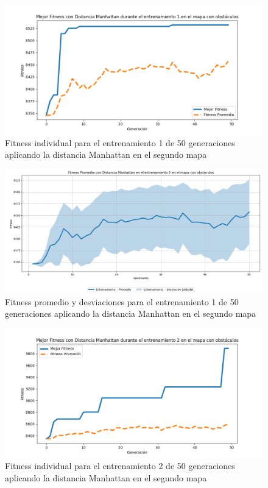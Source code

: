 \documentclass[lettersize, journal]{IEEEtran}
\begin{document}
\begin{figure}[H]
    \centering
    \includegraphics[width=0.9 \linewidth]{Manhattan/Mapa2/Fitness_1_Map2_Manh_50Gen.png}
    \caption{Fitness individual para el entrenamiento 1 de 50 generaciones aplicando la distancia Manhattan en el segundo mapa}
    \label{fig:manh_1_50_m2}
\end{figure}
\begin{figure}[H]
    \centering
    \includegraphics[width=0.9 \linewidth]{Manhattan/Mapa2/Fitness_1_Map2_Manh_50Gen_Sombra.png}
    \caption{Fitness promedio y desviaciones para el entrenamiento 1 de 50 generaciones aplicando la distancia Manhattan en el segundo mapa}
    \label{fig:manh_1_50_sombra_m2}
\end{figure}

\begin{figure}[H]
    \centering
    \includegraphics[width=0.9 \linewidth]{Manhattan/Mapa2/Fitness_2_Map2_Manh_50Gen.png}
    \caption{Fitness individual para el entrenamiento 2 de 50 generaciones aplicando la distancia Manhattan en el segundo mapa}
    \label{fig:manh_2_50_m2}
\end{figure}
\end{document}
